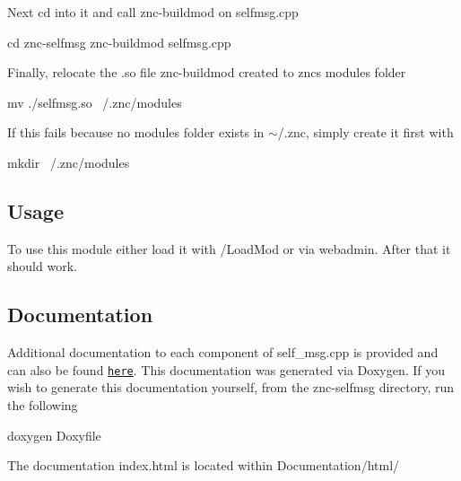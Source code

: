 Next cd into it and call znc-\/buildmod on selfmsg.\+cpp 
\begin{DoxyCode}
cd znc-selfmsg 
znc-buildmod selfmsg.cpp
\end{DoxyCode}


Finally, relocate the .so file znc-\/buildmod created to znc\textquotesingle{}s modules folder 
\begin{DoxyCode}
mv ./selfmsg.so ~/.znc/modules
\end{DoxyCode}


If this fails because no modules folder exists in $\sim$/.znc, simply create it first with 
\begin{DoxyCode}
mkdir ~/.znc/modules
\end{DoxyCode}


\subsection*{Usage}

To use this module either load it with /\+Load\+Mod or via webadmin. After that it should work.

\subsection*{Documentation}

Additional documentation to each component of self\+\_\+msg.\+cpp is provided and can also be found \href{https://zwimer.github.io/znc-selfmsg/}{\tt here}. This documentation was generated via Doxygen. If you wish to generate this documentation yourself, from the znc-\/selfmsg directory, run the following 
\begin{DoxyCode}
doxygen Doxyfile
\end{DoxyCode}


The documentation \textquotesingle{}index.\+html\textquotesingle{} is located within Documentation/html/ 